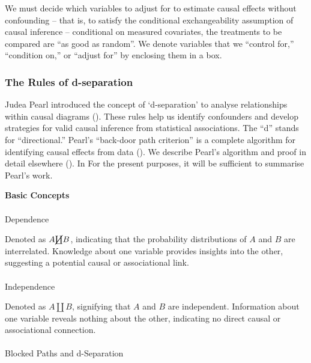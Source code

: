 \documentclass[
  singlecolumn]{article}
\makeatletter
\let\oldparagraph\paragraph
\renewcommand{\paragraph}{
    \@ifstar
      \xxxParagraphStar
      \xxxParagraphNoStar
  }
\newcommand{\xxxParagraphStar}[1]{\oldparagraph*{#1}\mbox{}}
\newcommand{\xxxParagraphNoStar}[1]{\oldparagraph{#1}\mbox{}}
\makeatother
\begin{document}
We must decide which variables to adjust for to estimate causal effects
without confounding -- that is, to satisfy the conditional
exchangeability assumption of causal inference -- conditional on
measured covariates, the treatments to be compared are ``as good as
random''. We denote variables that we ``control for,'' ``condition on,''
or ``adjust for'' by enclosing them in a box.

\subsubsection{The Rules of
d-separation}\label{the-rules-of-d-separation}

Judea Pearl introduced the concept of `d-separation' to analyse
relationships within causal diagrams (). These rules help us identify confounders and develop strategies
for valid causal inference from statistical associations. The ``d''
stands for ``directional.'' Pearl's ``back-door path criterion'' is a
complete algorithm for identifying causal effects from data
(). We describe Pearl's algorithm
and proof in detail elsewhere (). In For the present purposes, it will be sufficient to summarise
Pearl's work.

\textbf{Basic Concepts}

\paragraph{Dependence}\label{dependence}

Denoted as \(A \cancel\coprod B\), indicating that the probability
distributions of \(A\) and \(B\) are interrelated. Knowledge about one
variable provides insights into the other, suggesting a potential causal
or associational link.

\paragraph{Independence}\label{independence}

Denoted as \(A \coprod B\), signifying that \(A\) and \(B\) are
independent. Information about one variable reveals nothing about the
other, indicating no direct causal or associational connection.

\paragraph{Blocked Paths and
d-Separation}\label{blocked-paths-and-d-separation}
\end{document}
